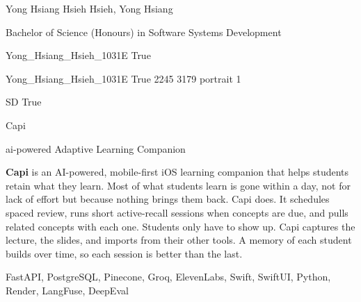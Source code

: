 
\begingroup{}\relax



\def\Key{Yong_Hsiang_Hsieh_1031E}

{Yong Hsiang Hsieh}
{Hsieh, Yong Hsiang}

{Bachelor of Science (Honours) in Software Systems Development}

{Yong_Hsiang_Hsieh_1031E}
{True}

{Yong_Hsiang_Hsieh_1031E}
{True}
{2245}
{3179}
{portrait}
{1}

{SD}
{True}

{Capi}

{ai-powered Adaptive Learning Companion}

{{\bfseries Capi} is an AI-powered, mobile-first iOS learning companion that helps students retain what they learn. Most of what students learn is gone within a day, not for lack of effort but because nothing brings them back. Capi does. It schedules spaced review, runs short active-recall sessions when concepts are due, and pulls related concepts with each one. Students only have to show up. Capi captures the lecture, the slides, and imports from their other tools. A memory of each student builds over time, so each session is better than the last.}

{FastAPI, PostgreSQL, Pinecone, Groq, ElevenLabs, Swift, SwiftUI, Python, Render, LangFuse, DeepEval}

